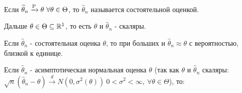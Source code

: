 \begin{definition}
    Если \(\widehat{\theta}_n \xrightarrow{\P} \theta \ \forall \theta \in \Theta\), то \(\widehat{\theta}_n\) называется состоятельной оценкой.
\end{definition}

\begin{remark}
    Дальше \(\theta \in \Theta \subseteq \R^1\), то есть \(\theta\) и \(\widehat{\theta}_n\) - скаляры.
\end{remark}

Если \(\widehat{\theta}_n\) - состоятельная оценка \(\theta\), то при больших и \(\widehat{\theta}_n \approx \theta\) с вероятностью, близкой к единице.

Если \(\widehat{\theta}_n\) - асимптотическая нормальная оценка \(\theta\) (так как \(\theta\) и \(\widehat{\theta}_n\) скаляры:
\(\sqrt{n}(\widehat{\theta}_n - \theta) \xrightarrow{d} N(0, \sigma^2(\theta)) \ 0 < \sigma^2 < \infty,\ \forall \theta \in \Theta\)), то:
